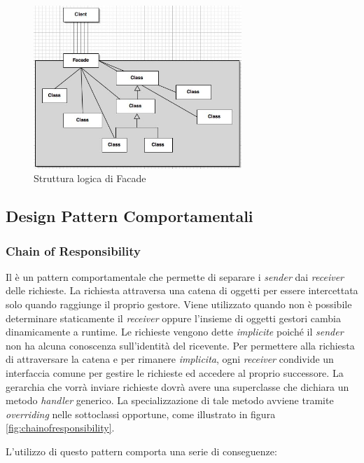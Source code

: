 \begin{figure}[H]
\centering \includegraphics[width=0.7\textwidth]{patterns/facade.jpg}
\caption{Struttura logica di Facade}
\label{fig:facade}
\end{figure}

\subsection{Design Pattern Comportamentali}

\subsubsection{Chain of Responsibility}
Il  è un pattern comportamentale che permette di separare i \emph{sender} dai \emph{receiver} delle richieste. La richiesta attraversa una catena di oggetti per essere intercettata solo quando raggiunge il proprio gestore. Viene utilizzato quando non è possibile determinare staticamente il \emph{receiver} oppure l'insieme di oggetti gestori cambia dinamicamente a runtime.
Le richieste vengono dette \emph{implicite} poiché il \emph{sender} non ha alcuna conoscenza sull'identità del ricevente. Per permettere alla richiesta di attraversare la catena e per rimanere \emph{implicita}, ogni \emph{receiver} condivide un interfaccia comune per gestire le richieste ed accedere al proprio successore. 
La gerarchia che vorrà inviare richieste dovrà avere una superclasse che dichiara un metodo \emph{handler} generico. La specializzazione di tale metodo avviene tramite \emph{overriding} nelle sottoclassi opportune, come illustrato in figura \ref{fig:chainofresponsibility}.	

L'utilizzo di questo pattern comporta una serie di conseguenze:
		
